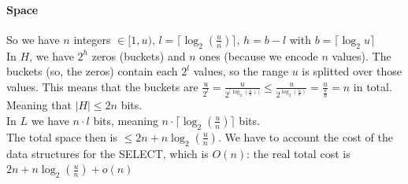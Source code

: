 \documentclass[10pt]{report}
\begin{document}
\paragraph{Space} So we have $n$ integers $\in[1, u)$, $l=\lceil\log_2(\frac{u}{n})\rceil$, $h = b - l$ with $b=\lceil\log_2 u\rceil$\\
In $H$, we have $2^h$ zeros (buckets) and $n$ ones (because we encode $n$ values). The buckets (so, the zeros) contain each $2^l$ values, so the range $u$ is splitted over those values. This means that the buckets are $\frac{u}{2^l} = \frac{u}{2^{\lceil\log_2(\frac{u}{n})\rceil}} \leq \frac{u}{2^{\log_2(\frac{u}{n})}} = \frac{u}{\frac{u}{n}} = n$ in total. Meaning that $|H| \leq 2n$ bits.\\
In $L$ we have $n \cdot l$ bits, meaning $n\cdot\lceil\log_2(\frac{u}{n})\rceil$ bits.\\
The total space then is $\leq 2n + n\log_2(\frac{u}{n})$. We have to account the cost of the data structures for the SELECT, which is $O(n)$: the real total cost is $2n + n\log_2(\frac{u}{n}) + o(n)$
\end{document}
